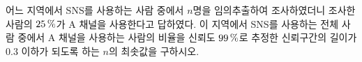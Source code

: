 어느 지역에서 SNS를 사용하는 사람 중에서 $n$명을 임의추출하여 조사하였더니 조사한 사람의 $25\mkern3mu \%$가 $\mathrm{A}$ 채널을 사용한다고 답하였다. 이 지역에서 SNS를 사용하는 전체 사람 중에서 $\mathrm{A}$ 채널을 사용하는 사람의 비율을 신뢰도 $99\mkern3mu \%$로 추정한 신뢰구간의 길이가 0.3 이하가 되도록 하는 $n$의 최솟값을 구하시오. 
